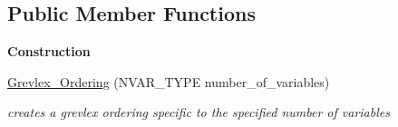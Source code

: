\subsection*{Public Member Functions}
\begin{Indent}\textbf{ Construction}\par
\begin{DoxyCompactItemize}
\item 
\mbox{\label{class_grevlex___ordering_a73efa1ac5de7104f4de26d6b2c1246ba}} 
\hyperlink{class_grevlex___ordering_a73efa1ac5de7104f4de26d6b2c1246ba}{Grevlex\+\_\+\+Ordering} (N\+V\+A\+R\+\_\+\+T\+Y\+PE number\+\_\+of\+\_\+variables)
\begin{DoxyCompactList}\small\item\em creates a grevlex ordering specific to the specified number of variables \end{DoxyCompactList}\end{DoxyCompactItemize}
\end{Indent}
